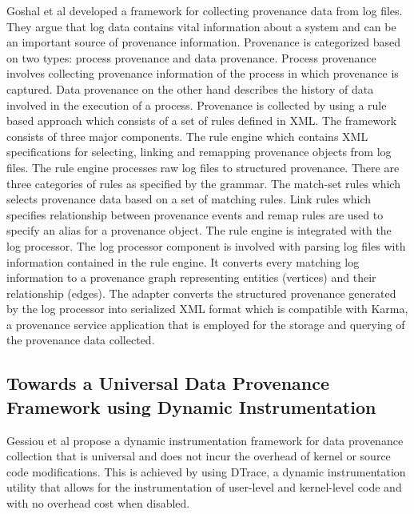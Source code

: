 Goshal et al \cite{ghoshal_provenance_2013} developed a framework for collecting provenance data from log files. They argue that log data contains vital information about a system and can be an important source of provenance information. Provenance is categorized based on two types: process provenance and data provenance. Process provenance involves collecting provenance information of the process in which provenance is captured. Data provenance on the other hand describes the history of data involved in the execution of a process. Provenance is collected by using a rule based approach which consists of a set of rules defined in XML. The framework consists of three major components. The rule engine which contains XML specifications for selecting, linking and remapping provenance objects from log files. The rule engine processes raw log files to structured provenance. There are three categories of rules as specified by the grammar. The match-set rules which selects provenance data based on a set of matching rules. Link rules which specifies relationship between provenance events and remap rules are used to specify an alias for a provenance object. The rule engine is integrated with the log processor. The log processor component is involved with parsing log files with information contained in the rule engine. It converts every matching log information to a provenance graph representing entities (vertices) and their relationship (edges). The adapter converts the structured provenance generated by the log processor into serialized XML format which is compatible with Karma, a provenance service application that is employed for the storage and querying of the provenance data collected.




\subsection{Towards a Universal Data Provenance Framework using Dynamic Instrumentation}
Gessiou et al \cite{gessiou_towards_2012} propose a dynamic instrumentation framework for data provenance collection that is universal and does not incur the overhead of kernel or source code modifications. This is achieved by using DTrace, a dynamic instrumentation utility that allows for the instrumentation of user-level and kernel-level code and with no overhead cost when disabled. 

